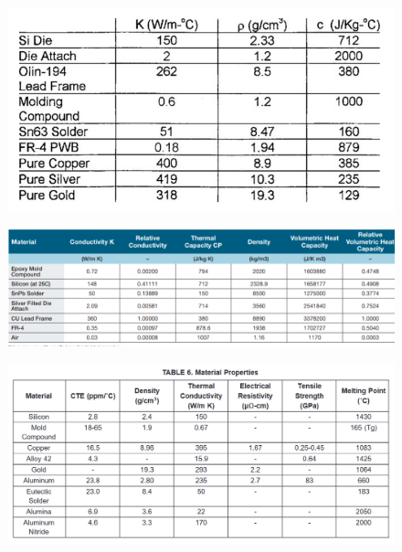\documentclass[final]{cubedoc}
\begin{document}
	\begin{figure}[h!]
		\centering
		\includegraphics[keepaspectratio, height=.25\textheight, width=\textwidth]{docs/package_properties_no1.png}
		\caption{\cite{kuo1998ic}}
		\label{fig:tab_1}
	\end{figure}
	
	\begin{figure}[h!]
		\centering
		\includegraphics[keepaspectratio, height=.25\textheight, width=\textwidth]{docs/package_properties_no2.png}
		\caption{\cite{nxp:material}}
		\label{fig:tab_2}
	\end{figure}
	
	\begin{figure}[h!]
		\centering
		\includegraphics[keepaspectratio, height=.25\textheight, width=\textwidth]{docs/TI_ic_assembly.png}
		\caption{\cite{ti:material}}
		\label{fig:tab_3}
	\end{figure}
	
\end{document}
